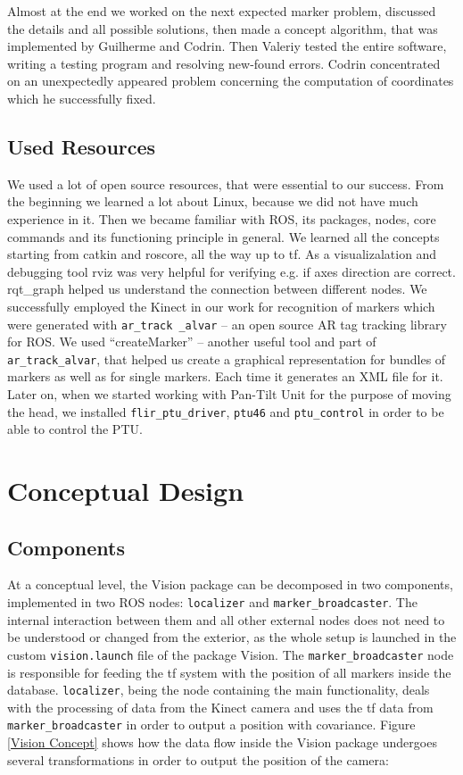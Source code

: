 Almost at the end we worked on the next expected marker problem, discussed the details and all possible solutions, then made a concept algorithm, that was implemented by Guilherme and Codrin. Then Valeriy  tested the entire software, writing a testing program and resolving new-found errors. Codrin concentrated on an unexpectedly appeared problem concerning the computation of coordinates which he successfully fixed.  

\subsection{Used Resources} 

We used a lot of open source resources, that were essential to our success. From the beginning we learned a lot about Linux, because we did not have much experience in it. Then we became familiar with ROS, its packages, nodes, core commands and its functioning principle in general. We learned all the concepts starting from catkin and roscore, all the way up to tf. As a visualizalation and debugging tool rviz was very helpful for verifying e.g. if axes direction are correct. rqt\_graph helped us understand the connection between different nodes. We successfully employed the Kinect in our work for recognition of markers which were generated with \texttt{ar\_track \_alvar} -- an open source AR tag tracking library for ROS. We used ``createMarker'' -- another useful tool and part of \texttt{ar\_track\_alvar}, that helped us create a graphical representation for bundles of markers as well as for single markers. Each time it generates an XML file for it. Later on, when we started working with Pan-Tilt Unit for the purpose of moving the head, we installed \texttt{flir\_ptu\_driver}, \texttt{ptu46} and \texttt{ptu\_control} in order to be able to control the PTU.

\section{Conceptual Design}

\subsection{Components}
At a conceptual level, the Vision package can be decomposed in two components, implemented in two ROS nodes: \texttt{localizer} and \texttt{marker\_broadcaster}. The internal interaction between them and all other external nodes does not need to be understood or changed from the exterior, as the whole setup is launched in the custom \texttt{vision.launch} file of the package Vision.
The \texttt{marker\_broadcaster} node is responsible for feeding the tf system with the position of all markers inside the database. \texttt{localizer}, being the node containing the main functionality, deals with the processing of data from the Kinect camera and uses the tf data from \texttt{marker\_broadcaster} in order to output a position with covariance. Figure \ref{Vision Concept} shows how the data flow inside the Vision package undergoes several transformations in order to output the position of the camera:

